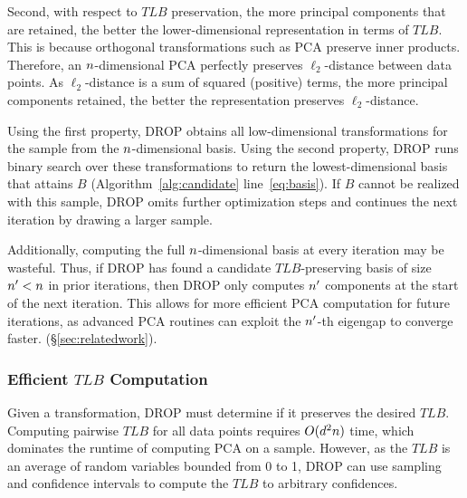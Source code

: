 Second, with respect to $TLB$ preservation, the more principal components that are retained, the better the lower-dimensional representation in terms of $TLB$.  
This is because orthogonal transformations such as PCA preserve inner products. 
Therefore, an ${\color{black}n}$-dimensional PCA perfectly preserves $\ell_2$-distance between data points. 
As $\ell_2$-distance is a sum of squared (positive) terms, the more principal components retained, the better the representation preserves $\ell_2$-distance.

Using the first property, DROP obtains all low-dimensional transformations for the sample from the ${\color{black}n}$-dimensional basis.  
Using the second property, DROP runs binary search over these transformations to return the lowest-dimensional basis that attains $B$ (Algorithm~\ref{alg:candidate} line~\ref{eq:basis}).
If $B$ cannot be realized with this sample, DROP omits further optimization steps and continues the next iteration by drawing a larger sample.

Additionally, computing the full ${\color{black}n}$-dimensional basis at every iteration may be wasteful. 
Thus, if DROP has found a candidate $TLB$-preserving basis of size ${\color{black}n}' < {\color{black}n}$ in prior iterations, then DROP only computes ${\color{black}n}'$ components at the start of the next iteration.
This allows for more efficient PCA computation for future iterations, as advanced PCA routines can exploit the ${\color{black}n}'$-th eigengap to converge faster. (\S\ref{sec:relatedwork}).



\subsubsection{Efficient $TLB$ Computation}

Given a transformation, DROP must determine if it preserves the desired $TLB$.
Computing pairwise $TLB$ for all data points requires $O({\color{black}d}^2{\color{black}n})$ time, which dominates the runtime of computing PCA on a sample.
However, as the $TLB$ is an average of random variables bounded from 0 to 1, DROP can use sampling and confidence intervals to compute the $TLB$ to arbitrary confidences.

